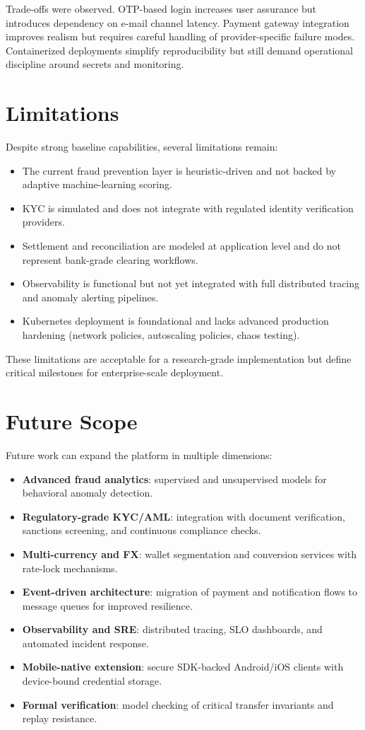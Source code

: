 \documentclass[conference]{IEEEtran}
\begin{document}
Trade-offs were observed. OTP-based login increases user assurance but introduces dependency on e-mail channel latency. Payment gateway integration improves realism but requires careful handling of provider-specific failure modes. Containerized deployments simplify reproducibility but still demand operational discipline around secrets and monitoring.

\section{Limitations}
Despite strong baseline capabilities, several limitations remain:
\begin{itemize}
\item The current fraud prevention layer is heuristic-driven and not backed by adaptive machine-learning scoring.
\item KYC is simulated and does not integrate with regulated identity verification providers.
\item Settlement and reconciliation are modeled at application level and do not represent bank-grade clearing workflows.
\item Observability is functional but not yet integrated with full distributed tracing and anomaly alerting pipelines.
\item Kubernetes deployment is foundational and lacks advanced production hardening (network policies, autoscaling policies, chaos testing).
\end{itemize}

These limitations are acceptable for a research-grade implementation but define critical milestones for enterprise-scale deployment.

\section{Future Scope}
Future work can expand the platform in multiple dimensions:
\begin{itemize}
\item \textbf{Advanced fraud analytics}: supervised and unsupervised models for behavioral anomaly detection.
\item \textbf{Regulatory-grade KYC/AML}: integration with document verification, sanctions screening, and continuous compliance checks.
\item \textbf{Multi-currency and FX}: wallet segmentation and conversion services with rate-lock mechanisms.
\item \textbf{Event-driven architecture}: migration of payment and notification flows to message queues for improved resilience.
\item \textbf{Observability and SRE}: distributed tracing, SLO dashboards, and automated incident response.
\item \textbf{Mobile-native extension}: secure SDK-backed Android/iOS clients with device-bound credential storage.
\item \textbf{Formal verification}: model checking of critical transfer invariants and replay resistance.
\end{itemize}
\end{document}
